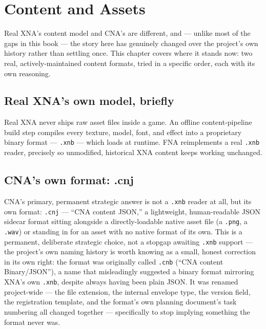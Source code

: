 \chapter{Content and Assets}
\label{ch:content-and-assets}

Real XNA's content model and CNA's are different, and --- unlike most of the gaps in this
book --- the story here has genuinely changed over the project's own history rather than
settling once. This chapter covers where it stands now: two real, actively-maintained content
formats, tried in a specific order, each with its own reasoning.

\section{Real XNA's own model, briefly}

Real XNA never ships raw asset files inside a game. An offline content-pipeline build step
compiles every texture, model, font, and effect into a proprietary binary format ---
\texttt{.xnb} --- which  loads at runtime. FNA
reimplements a real \texttt{.xnb} reader, precisely so unmodified, historical XNA content
keeps working unchanged.

\section{CNA's own format: .cnj}
\label{sec:cnj}

CNA's primary, permanent strategic answer is not a \texttt{.xnb} reader at all, but its own
format: \texttt{.cnj} --- ``CNA content JSON,'' a lightweight, human-readable JSON sidecar
format sitting alongside a directly-loadable native asset file (a \texttt{.png}, a
\texttt{.wav}) or standing in for an asset with no native format of its own. This is a
permanent, deliberate strategic choice, not a stopgap awaiting \texttt{.xnb} support --- the
project's own naming history is worth knowing as a small, honest correction in its own right:
the format was originally called \texttt{.cnb} (``CNA content Binary/JSON''), a name that
misleadingly suggested a binary format mirroring XNA's own \texttt{.xnb}, despite always
having been plain JSON. It was renamed project-wide --- the file extension, the internal
envelope type, the version field, the registration template, and the format's own planning
document's task numbering all changed together --- specifically to stop implying something
the format never was.


